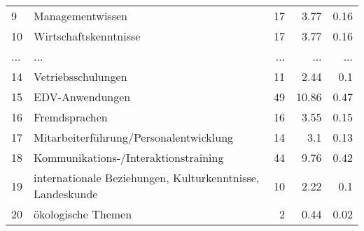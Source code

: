 \begin{longtable}{lXrrr}
        9 & \multicolumn{1}{X}{Managementwissen} & %
          \num{17} &
          \num[round-mode=places,round-precision=2]{3.77} &
          \num[round-mode=places,round-precision=2]{0.16} \\
        10 & \multicolumn{1}{X}{Wirtschaftskenntnisse} & %
          \num{17} &
          \num[round-mode=places,round-precision=2]{3.77} &
          \num[round-mode=places,round-precision=2]{0.16} \\
       ... & ... & ... & ... & ... \\
        14 & \multicolumn{1}{X}{Vetriebsschulungen} & %
          \num{11} &
          \num[round-mode=places,round-precision=2]{2.44} &
          \num[round-mode=places,round-precision=2]{0.1} \\

        15 & \multicolumn{1}{X}{EDV-Anwendungen} & %
          \num{49} &
          \num[round-mode=places,round-precision=2]{10.86} &
          \num[round-mode=places,round-precision=2]{0.47} \\

        16 & \multicolumn{1}{X}{Fremdsprachen} & %
          \num{16} &
          \num[round-mode=places,round-precision=2]{3.55} &
          \num[round-mode=places,round-precision=2]{0.15} \\

        17 & \multicolumn{1}{X}{Mitarbeiterführung/Personalentwicklung} & %
          \num{14} &
          \num[round-mode=places,round-precision=2]{3.1} &
          \num[round-mode=places,round-precision=2]{0.13} \\

        18 & \multicolumn{1}{X}{Kommunikations-/Interaktionstraining} & %
          \num{44} &
          \num[round-mode=places,round-precision=2]{9.76} &
          \num[round-mode=places,round-precision=2]{0.42} \\

        19 & \multicolumn{1}{X}{internationale Beziehungen, Kulturkenntnisse, Landeskunde} & %
          \num{10} &
          \num[round-mode=places,round-precision=2]{2.22} &
          \num[round-mode=places,round-precision=2]{0.1} \\

        20 & \multicolumn{1}{X}{ökologische Themen} & %
          \num{2} &
          \num[round-mode=places,round-precision=2]{0.44} &
          \num[round-mode=places,round-precision=2]{0.02} \\


\end{longtable}
